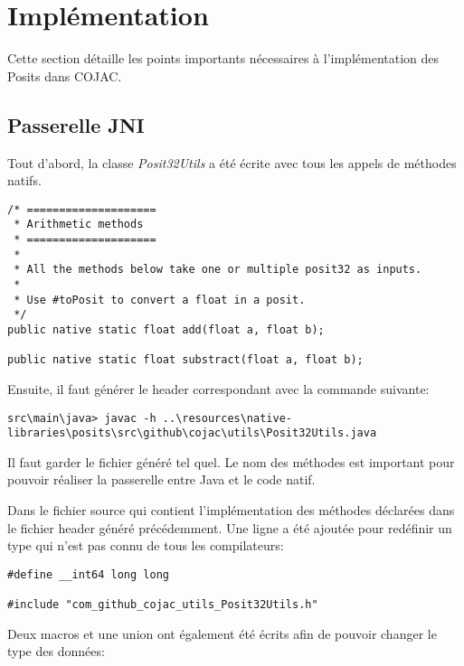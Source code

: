 \section{Implémentation}

Cette section détaille les points importants nécessaires à l'implémentation des \glspl{Posit} dans \gls{COJAC}.

\subsection{Passerelle JNI}

\begin{minipage2}
Tout d'abord, la classe \textit{Posit32Utils} a été écrite avec tous les appels de méthodes natifs.

\begin{verbatim}
/* ====================
 * Arithmetic methods
 * ====================
 *
 * All the methods below take one or multiple posit32 as inputs.
 *
 * Use #toPosit to convert a float in a posit.
 */
public native static float add(float a, float b);

public native static float substract(float a, float b);
\end{verbatim}
\end{minipage2}

\begin{minipage2}
Ensuite, il faut générer le header correspondant avec la commande suivante:

\begin{verbatim}
src\main\java> javac -h ..\resources\native-libraries\posits\src\github\cojac\utils\Posit32Utils.java
\end{verbatim}

Il faut garder le fichier généré tel quel. Le nom des méthodes est important pour pouvoir réaliser la passerelle entre Java et le code natif.
\end{minipage2}

Dans le fichier source qui contient l'implémentation des méthodes déclarées dans le fichier header généré précédemment. Une ligne a été ajoutée pour redéfinir un type qui n'est pas connu de tous les compilateurs:

\begin{verbatim}
#define __int64 long long

#include "com_github_cojac_utils_Posit32Utils.h"
\end{verbatim}

Deux macros et une union ont également été écrits afin de pouvoir changer le type des données:

